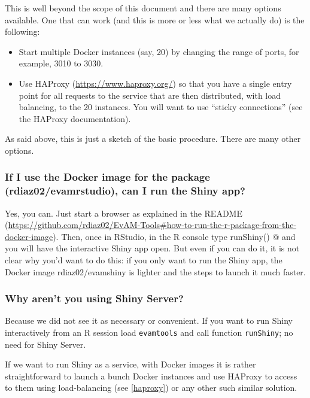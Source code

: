 \documentclass[a4paper,11pt]{article}
\begin{document}
This is well beyond the scope of this document and there are many options available. One that can work (and this is more or less what we actually do) is the following:

\begin{itemize}
\item Start multiple Docker instances (say, 20) by changing the range of ports, for example, 3010 to 3030.
\item Use HAProxy (\url{https://www.haproxy.org/}) so that you have a single entry point for all requests to the service that are then distributed, with load balancing, to the 20 instances. You will want to use ``sticky connections'' (see the HAProxy documentation).
\end{itemize}

As said above, this is just a sketch of the basic procedure. There are many other options.


\subsubsection{If I use the Docker image for the package (rdiaz02/evamrstudio), can I run the Shiny app?}

Yes, you can. Just start a browser as explained in the README (\url{https://github.com/rdiaz02/EvAM-Tools#how-to-run-the-r-package-from-the-docker-image}). Then, once in RStudio, in the R console type \verb@ runShiny() @ and you will have the interactive Shiny app open. But even if you can do it, it is not clear why you'd want to do this: if you only want to run the Shiny app, the Docker image rdiaz02/evamshiny is lighter and the steps to launch it much faster.



\subsubsection{Why aren't you using Shiny Server?}
\label{sec:why-arent-you}

Because we did not see it as necessary or convenient. If you want to run Shiny interactively from an R session load \texttt{evamtools} and call function \texttt{runShiny}; no need for Shiny Server.

If we want to run Shiny as a service, with Docker images it is rather straightforward to launch a bunch Docker instances and use HAProxy to access to them using load-balancing (see \ref{haproxy}) or any other such similar solution.
\end{document}

